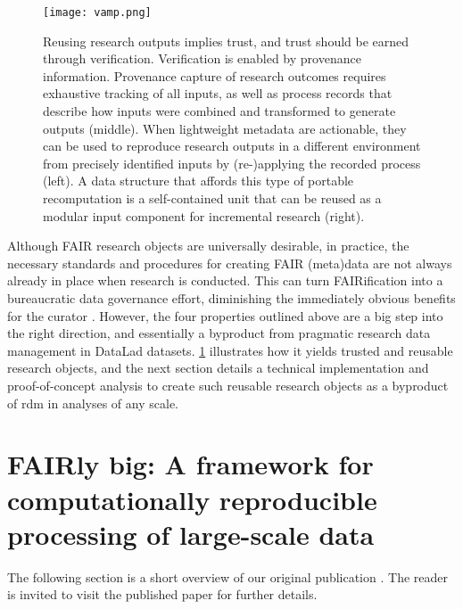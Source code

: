\begin{figure}
	\centering
	\texttt{[image: vamp.png]}
	\caption[DataLad datasets as reusable research objects]{Reusing research outputs implies trust, and trust should be earned through verification. Verification is enabled by provenance information. Provenance capture of research outcomes requires exhaustive tracking of all inputs, as well as process records that describe how inputs were combined and transformed to generate outputs (middle). When lightweight metadata are actionable, they can be used to reproduce research outputs in a different environment from precisely identified inputs by (re-)applying the recorded process (left). A data structure that affords this type of portable recomputation is a self-contained unit that can be reused as a modular input component for incremental research (right).
	}
	\label{fig:vamp}
\end{figure}





Although FAIR research objects are universally desirable, in practice, the necessary standards and procedures for creating FAIR (meta)data are not always already in place when research is conducted.
This can turn FAIRification into a bureaucratic data governance effort, diminishing the immediately obvious benefits for the curator \citep{zehl2016handling}.
However, the four properties outlined above are a big step into the right direction, and essentially a byproduct from pragmatic research data management in DataLad datasets.
\cref{fig:vamp} illustrates how it yields trusted and reusable research objects, and the next section details a technical implementation and proof-of-concept analysis to create such reusable research objects as a byproduct of \gls{rdm} in analyses of any scale.

\pagebreak

\section{FAIRly big: A framework for computationally reproducible processing of large-scale data}

The following section is a short overview of our original publication \citet{wagner2022fairly}. The reader is invited to visit the published paper for further details.

